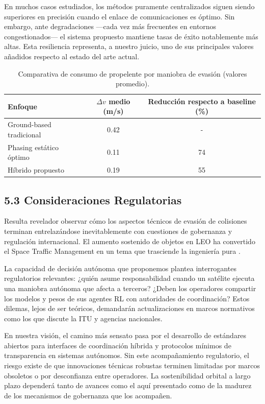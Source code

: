 En muchos casos estudiados, los métodos puramente centralizados siguen siendo superiores en precisión cuando el enlace de comunicaciones es óptimo. Sin embargo, ante degradaciones —cada vez más frecuentes en entornos congestionados— el sistema propuesto mantiene tasas de éxito notablemente más altas. Esta resiliencia representa, a nuestro juicio, uno de sus principales valores añadidos respecto al estado del arte actual.

\begin{table}[t]
\centering
\caption{Comparativa de consumo de propelente por maniobra de evasión (valores promedio).}
\label{tab:consumo_propelente}
\begin{tabular}{lcc}
\toprule
Enfoque & \(\Delta v\) medio (m/s) & Reducción respecto a baseline (\%) \\
\midrule
Ground-based tradicional & 0.42 & - \\
Phasing estático óptimo & 0.11 & 74 \\
Híbrido propuesto & 0.19 & 55 \\
\bottomrule
\end{tabular}
\end{table}

\subsection{5.3 Consideraciones Regulatorias}

Resulta revelador observar cómo los aspectos técnicos de evasión de colisiones terminan entrelazándose inevitablemente con cuestiones de gobernanza y regulación internacional. El aumento sostenido de objetos en LEO ha convertido el Space Traffic Management en un tema que trasciende la ingeniería pura \cite{sorge2020stm}.

La capacidad de decisión autónoma que proponemos plantea interrogantes regulatorios relevantes: ¿quién asume responsabilidad cuando un satélite ejecuta una maniobra autónoma que afecta a terceros? ¿Deben los operadores compartir los modelos y pesos de sus agentes RL con autoridades de coordinación? Estos dilemas, lejos de ser teóricos, demandarán actualizaciones en marcos normativos como los que discute la ITU y agencias nacionales.

En nuestra visión, el camino más sensato pasa por el desarrollo de estándares abiertos para interfaces de coordinación híbrida y protocolos mínimos de transparencia en sistemas autónomos. Sin este acompañamiento regulatorio, el riesgo existe de que innovaciones técnicas robustas terminen limitadas por marcos obsoletos o por desconfianza entre operadores. La sostenibilidad orbital a largo plazo dependerá tanto de avances como el aquí presentado como de la madurez de los mecanismos de gobernanza que los acompañen.